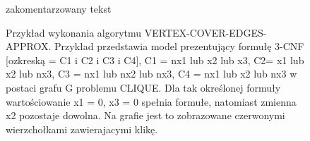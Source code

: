 \begin{figure}[tbh]

\caption{Przykład wykonania algorytmu VERTEX-COVER-EDGES-APPROX. Przykład przedstawia model prezentujący formułę 3-CNF [ozkreską = C1 i C2 i C3 i C4], C1 = nx1 lub x2 lub x3, C2= x1 lub x2 lub nx3, C3 = nx1 lub nx2 lub nx3, C4 = nx1 lub x2 lub nx3 w postaci grafu G problemu CLIQUE. Dla tak określonej formuły wartościowanie x1 = 0, x3 = 0 spełnia formułe, natomiast zmienna x2 pozostaje dowolna. Na grafie jest to zobrazowane czerwonymi wierzchołkami zawierajacymi klikę. }
\label{vertex-cover-edges-approx_example}

zakomentarzowany tekst
\end{figure}